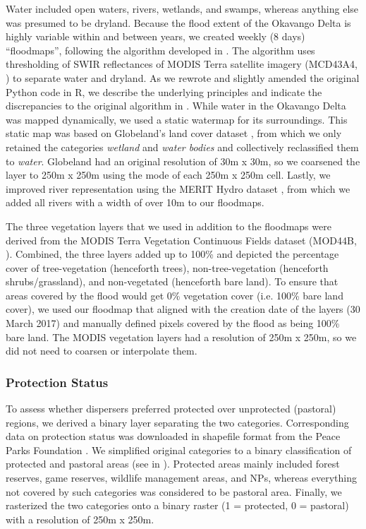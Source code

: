 \documentclass[abstract=on,10pt,a4paper,bibliography=totocnumbered]{scrartcl}
\begin{document}
Water included open waters, rivers, wetlands, and swamps, whereas anything else
was presumed to be dryland. Because the flood extent of the Okavango Delta is
highly variable within and between years, we created weekly (8 days)
``floodmaps'', following the algorithm developed in \cite{Wolski.2017}. The
algorithm uses thresholding of SWIR reflectances of MODIS Terra satellite
imagery (MCD43A4, \citealp{Schaaf.2015}) to separate water and dryland. As we
rewrote and slightly amended the original Python code in R, we describe the
underlying principles and indicate the discrepancies to the original algorithm
in . While water in the Okavango Delta was
mapped dynamically, we used a static watermap for its surroundings. This static
map was based on Globeland's land cover dataset \citep{Chen.2015}, from which we
only retained the categories \textit{wetland} and \textit{water bodies} and
collectively reclassified them to \textit{water}. Globeland had an original
resolution of 30m x 30m, so we coarsened the layer to 250m x 250m using the mode
of each 250m x 250m cell. Lastly, we improved river representation using the
MERIT Hydro dataset \citep{Yamazaki.2019}, from which we added all rivers with a
width of over 10m to our floodmaps.

The three vegetation layers that we used in addition to the floodmaps were
derived from the MODIS Terra Vegetation Continuous Fields dataset (MOD44B,
\citealp{Dimiceli.2015}). Combined, the three layers added up to 100\% and
depicted the percentage cover of tree-vegetation (henceforth trees),
non-tree-vegetation (henceforth shrubs/grassland), and non-vegetated (henceforth
bare land). To ensure that areas covered by the flood would get 0\% vegetation
cover (i.e. 100\% bare land cover), we used our floodmap that aligned with the
creation date of the layers (30 March 2017) and manually defined pixels covered
by the flood as being 100\% bare land. The MODIS vegetation layers had a
resolution of 250m x 250m, so we did not need to coarsen or interpolate them.

\subsubsection{Protection Status}
To assess whether dispersers preferred protected over unprotected (pastoral)
regions, we derived a binary layer separating the two categories. Corresponding
data on protection status was downloaded in shapefile format from the Peace
Parks Foundation \citep{PeaceParks.2019}. We simplified original categories to a
binary classification of protected and pastoral areas (see
 in ). Protected areas
mainly included forest reserves, game reserves, wildlife management areas, and
NPs, whereas everything not covered by such categories was considered to be
pastoral area. Finally, we rasterized the two categories onto a binary raster (1
= protected, 0 = pastoral) with a resolution of 250m x 250m.
\end{document}
